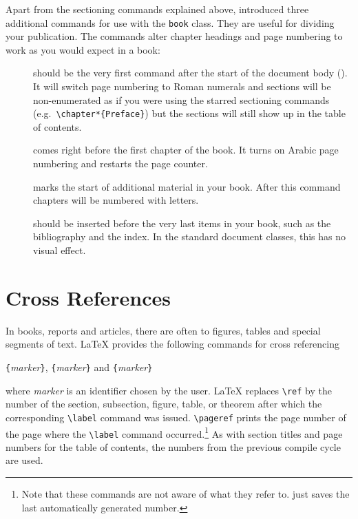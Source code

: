 Apart from the sectioning commands explained above, \LaTeXe{}
introduced three additional commands for use with the \verb|book| class.
They are useful for dividing your publication. The commands alter
chapter headings and page numbering to work as you would expect in
a book:
\begin{description}
\item[] should be the very first command after
  the start of the document body (\verb||). It will switch page numbering to Roman
    numerals and sections will be non-enumerated as if you were using
    the starred sectioning commands (e.g.\ \verb|\chapter*{Preface}|)
    but the sections will still show up in the table of contents.
\item[] comes right before the first chapter of
  the book. It turns on Arabic page numbering and restarts the page
  counter.
\item[] marks the start of additional material in your
  book. After this command chapters will be numbered with letters.
\item[] should be inserted before the very last items
  in your book, such as the bibliography and the index. In the standard
  document classes, this has no visual effect.
\end{description}


\section{Cross References}

In books, reports and articles, there are often
 to figures, tables and special segments of text.
\LaTeX{} provides the following commands for cross referencing
\begin{lscommand}
\verb|{|\emph{marker}\verb|}|, \verb|{|\emph{marker}\verb|}|
and \verb|{|\emph{marker}\verb|}|
\end{lscommand}
\noindent where \emph{marker} is an identifier chosen by the user. \LaTeX{}
replaces \verb|\ref| by the number of the section, subsection, figure,
table, or theorem after which the corresponding \verb|\label| command
was issued. \verb|\pageref| prints the page number of the
page where the \verb|\label| command occurred.\footnote{Note that these commands
  are not aware of what they refer to.  just saves the last
  automatically generated number.} As with section titles and page numbers for the table of contents,
the numbers from the previous compile cycle are used.


